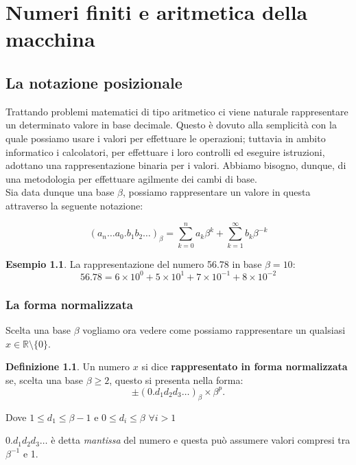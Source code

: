 \documentclass[12pt, a4paper]{book}
\theoremstyle{definition}
\newtheorem{exmp}{Esempio}[section]
\newtheorem{defn}{Definizione}[section]
\begin{document}
\chapter{Numeri finiti e aritmetica della macchina}

\section{La notazione posizionale}
\begin{flushleft}
Trattando problemi matematici di tipo aritmetico ci viene naturale rappresentare un determinato valore in base decimale. Questo è dovuto alla semplicità con la quale possiamo usare i valori per effettuare le operazioni; tuttavia in ambito informatico i calcolatori, per effettuare i loro controlli ed eseguire istruzioni, adottano una rappresentazione binaria per i valori. Abbiamo bisogno, dunque, di una metodologia per effettuare agilmente dei cambi di base.\\

Sia data dunque una base $\beta$, possiamo rappresentare un valore in questa attraverso la seguente notazione:

\[ 
	(a_{n}\dots a_{0}.b_{1}b_{2}\dots)_{\beta} = \sum_{k=0}^{n}a_{k}\beta^{k} + \sum_{k=1}^{\infty}b_{k}\beta^{-k} 
\]

\begin{exmp}
La rappresentazione del numero 56.78 in base $\beta = 10$:
\[ 
	56.78 = 6 \times 10^{0} + 5 \times 10^{1} + 7 \times 10^{-1} + 8 \times 10^{-2}
\]
\end{exmp}
\end{flushleft}


\subsection{La forma normalizzata}
\begin{flushleft}
Scelta una base $\beta$ vogliamo ora vedere come possiamo rappresentare un qualsiasi $x \in \mathbb{R}  \setminus \{ 0 \}$.

\begin{defn}
Un numero $x$ si dice \textbf{rappresentato in forma normalizzata} se,  scelta una base $\beta \geq 2$,  questo si presenta nella forma: 
\[ 
	\pm (0.d_{1}d_{2}d_{3}\dots)_{\beta} \times \beta^{p}. 
\]

Dove $ 1 \leq d_{1} \leq \beta - 1 $ e $ 0 \leq d_{i} \leq \beta $ $\forall i > 1$
\end{defn}
$0.d_{1}d_{2}d_{3}\dots$ è detta \textit{mantissa} del numero e questa può assumere valori compresi tra $\beta^{-1}$ e 1.
\end{flushleft}
\end{document}
